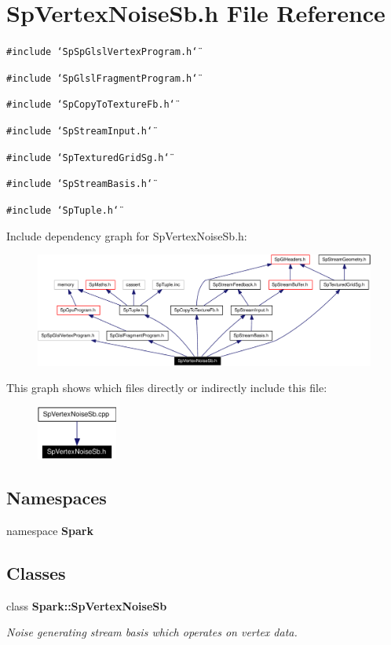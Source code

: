 \section{Sp\-Vertex\-Noise\-Sb.h File Reference}
\label{SpVertexNoiseSb_8h}
{\tt \#include \char`\"{}Sp\-Sp\-Glsl\-Vertex\-Program.h\char`\"{}}\par
{\tt \#include \char`\"{}Sp\-Glsl\-Fragment\-Program.h\char`\"{}}\par
{\tt \#include \char`\"{}Sp\-Copy\-To\-Texture\-Fb.h\char`\"{}}\par
{\tt \#include \char`\"{}Sp\-Stream\-Input.h\char`\"{}}\par
{\tt \#include \char`\"{}Sp\-Textured\-Grid\-Sg.h\char`\"{}}\par
{\tt \#include \char`\"{}Sp\-Stream\-Basis.h\char`\"{}}\par
{\tt \#include \char`\"{}Sp\-Tuple.h\char`\"{}}\par


Include dependency graph for Sp\-Vertex\-Noise\-Sb.h:\begin{figure}[H]
\begin{center}
\leavevmode
\includegraphics[width=387pt]{SpVertexNoiseSb_8h__incl}
\end{center}
\end{figure}


This graph shows which files directly or indirectly include this file:\begin{figure}[H]
\begin{center}
\leavevmode
\includegraphics[width=75pt]{SpVertexNoiseSb_8h__dep__incl}
\end{center}
\end{figure}
\subsection*{Namespaces}
\begin{CompactItemize}
\item 
namespace {\bf Spark}
\end{CompactItemize}
\subsection*{Classes}
\begin{CompactItemize}
\item 
class {\bf Spark::Sp\-Vertex\-Noise\-Sb}
\begin{CompactList}\small\item\em Noise generating stream basis which operates on vertex data. \item\end{CompactList}\end{CompactItemize}
